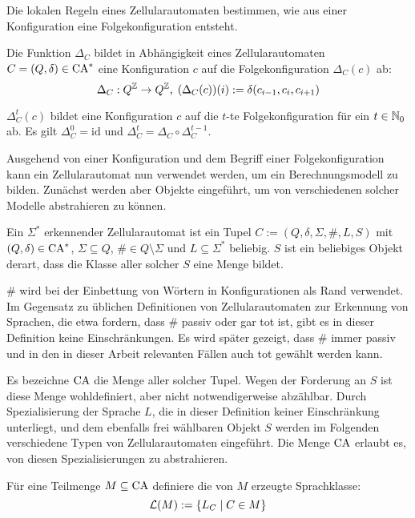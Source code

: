 Die lokalen Regeln eines Zellularautomaten bestimmen, wie aus einer Konfiguration eine Folgekonfiguration entsteht.

\begin{definition}[Folgekonfiguration]
    Die Funktion $\Delta_C$ bildet in Abhängigkeit eines
    Zellularautomaten $C = (Q, \delta) \in \textrm{CA}^*$ eine Konfiguration $c$ auf die Folgekonfiguration $\Delta_C(c)$ ab:
    \[ 
        \Delta_C: Q^{\mathbb{Z}} \to Q^{\mathbb{Z}}, \;
        (\Delta_C(c))(i) := \delta(c_{i - 1}, c_i, c_{i + 1})
    \]
    
    $\Delta_C^t(c)$ bildet eine Konfiguration $c$ auf die $t$-te Folgekonfiguration für ein $t \in \mathbb{N}_0$ ab.
    Es gilt $\Delta_C^0 = \mathrm{id}$ und $\Delta_C^t = \Delta_C \circ \Delta_C^{t-1}$.
\end{definition}

Ausgehend von einer Konfiguration und dem Begriff einer Folgekonfiguration kann ein Zellularautomat nun verwendet werden,
um ein Berechnungsmodell zu bilden. Zunächst werden aber Objekte eingeführt, um von verschiedenen solcher Modelle abstrahieren zu können.

\begin{definition}
    Ein $\Sigma^*$ erkennender Zellularautomat ist ein Tupel $C := (Q, \delta, \Sigma, \#, L, S)$ 
    mit $(Q, \delta) \in \textrm{CA}^*$, $\Sigma \subseteq Q$, $\# \in Q \setminus \Sigma$ und $L \subseteq \Sigma^*$ beliebig.
    $S$ ist ein beliebiges Objekt derart, dass die Klasse aller solcher $S$ eine Menge bildet.
    
    \# wird bei der Einbettung von Wörtern in Konfigurationen als Rand verwendet.
    Im Gegensatz zu üblichen Definitionen von Zellularautomaten zur Erkennung von Sprachen, die etwa fordern, dass $\#$ passiv oder gar tot ist,
    gibt es in dieser Definition keine Einschränkungen.
    Es wird später gezeigt, dass $\#$ immer passiv und in den in dieser Arbeit relevanten Fällen auch tot gewählt werden kann.

    Es bezeichne $\textrm{CA}$ die Menge aller solcher Tupel. Wegen der Forderung an $S$ ist diese Menge wohldefiniert, aber nicht notwendigerweise abzählbar.
    Durch Spezialisierung der Sprache $L$, die in dieser Definition keiner Einschränkung unterliegt,
    und dem ebenfalls frei wählbaren Objekt $S$ werden im Folgenden verschiedene Typen von Zellularautomaten eingeführt.
    Die Menge $\textrm{CA}$ erlaubt es, von diesen Spezialisierungen zu abstrahieren.
    
    Für eine Teilmenge $M \subseteq \textrm{CA}$ definiere die von $M$ erzeugte Sprachklasse:
    \[
        \mathcal{L}(M) := \{ { L_C } \; | \; { C \in M } \}
    \]
\end{definition}

